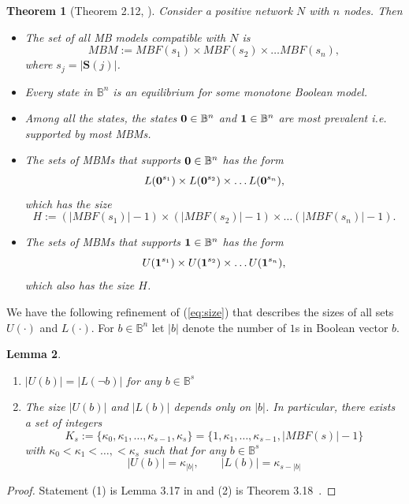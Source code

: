 \documentclass[12pt]{amsart}
\newcommand{\bzero}{{\bf 0}}
\newcommand{\bone}{{\bf 1}}
\newcommand{\bbB}{\mathbb{B}}
\newcommand{\Sources}{\mathbf{S}}
\newtheorem{thm}{Theorem}[section]
\newtheorem{lem}[thm]{Lemma}
\theoremstyle{definition}
\begin{document}
\begin{thm}[Theorem 2.12, \cite{adigwe_characterization_2026}] \label{thm:most_common}
Consider a positive network $N$ with $n$ nodes. Then 

\begin{itemize}
\item The set of all MB models compatible with $N$ is 
    \[ MBM:= MBF(s_1)\times MBF(s_2) \times \ldots MBF(s_n),\]
where $s_j=|\Sources(j)|$.
\item Every state in $\bbB^n$ is an equilibrium for some monotone Boolean model.
\item Among all the states, the states $\bzero \in \bbB^n$ and $\bone \in \bbB^n$ are most prevalent i.e. supported by most MBMs.
\item The sets of MBMs that supports $\bzero \in \bbB^n$ has the form 
    \[ L(\bzero^{s_1})\times L(\bzero^{s_2}) \times \ldots L(\bzero^{s_n}),\]
which has the size 
\begin{equation} 
\label{eq:size}
H:=(|MBF(s_1)|-1)\times (|MBF(s_2)|-1) \times \ldots (|MBF(s_n)|-1).
\end{equation}
\item The sets of MBMs that supports $\bone\in \bbB^n$ has the form 
    \[ U(\bone^{s_1})\times U(\bone^{s_2}) \times \ldots U(\bone^{s_n}),\]
which also has the size $H$.
\end{itemize}
\end{thm} 

We have the following refinement of (\ref{eq:size}) that describes the sizes of all sets $U(\cdot)$ and $L(\cdot)$.
For $b\in \bbB^n$ let $|b|$ denote the number of $1$s in Boolean vector $b.$

\begin{lem} \label{lem:sizes}
\begin{enumerate}
\item $|U(b)|=|L(\neg b)|$ for any $b\in \bbB^s$
\item
The size $|U(b)|$ and $|L(b)|$ depends only on $|b|$. 
In particular, there exists a set of integers 
\[ K_s:=\{\kappa_0,\kappa_1,\ldots, \kappa_{s-1}, \kappa_{s}\} =\{1,\kappa_1,\ldots, \kappa_{s-1}, |MBF(s)|-1\} \]
with $\kappa_0<\kappa_1<\ldots,< \kappa_s$
such that for any $b\in \bbB^s$
\begin{equation} \label{Ssizes}
|U(b)| = \kappa_{|b|}, \qquad |L(b)| = \kappa_{s-|b|}
\end{equation}
\end{enumerate}
\end{lem}
\begin{proof}
Statement (1) is Lemma 3.17 in \cite{adigwe_characterization_2026} and (2) is Theorem 3.18~\cite{adigwe_characterization_2026}.
\end{proof}
\end{document}
